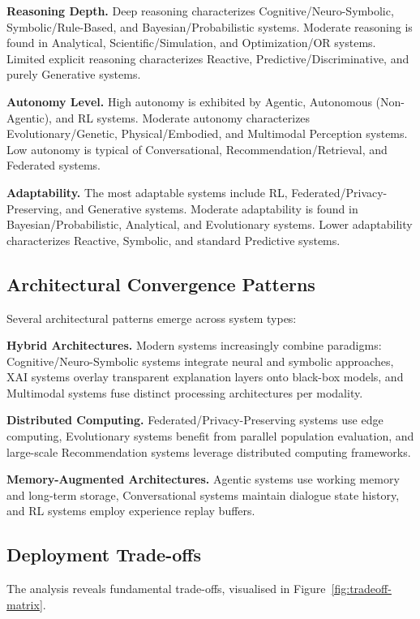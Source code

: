 \documentclass[12pt, a4paper]{article}
\begin{document}
\textbf{Reasoning Depth.} Deep reasoning characterizes Cognitive/Neuro-Symbolic, Symbolic/Rule-Based, and Bayesian/Probabilistic systems. Moderate reasoning is found in Analytical, Scientific/Simulation, and Optimization/OR systems. Limited explicit reasoning characterizes Reactive, Predictive/Discriminative, and purely Generative systems.

\textbf{Autonomy Level.} High autonomy is exhibited by Agentic, Autonomous (Non-Agentic), and RL systems. Moderate autonomy characterizes Evolutionary/Genetic, Physical/Embodied, and Multimodal Perception systems. Low autonomy is typical of Conversational, Recommendation/Retrieval, and Federated systems.

\textbf{Adaptability.} The most adaptable systems include RL, Federated/Privacy-Preserving, and Generative systems. Moderate adaptability is found in Bayesian/Probabilistic, Analytical, and Evolutionary systems. Lower adaptability characterizes Reactive, Symbolic, and standard Predictive systems.

\subsection{Architectural Convergence Patterns}

Several architectural patterns emerge across system types:

\textbf{Hybrid Architectures.} Modern systems increasingly combine paradigms: Cognitive/Neuro-Symbolic systems integrate neural and symbolic approaches, XAI systems overlay transparent explanation layers onto black-box models, and Multimodal systems fuse distinct processing architectures per modality.

\textbf{Distributed Computing.} Federated/Privacy-Preserving systems use edge computing, Evolutionary systems benefit from parallel population evaluation, and large-scale Recommendation systems leverage distributed computing frameworks.

\textbf{Memory-Augmented Architectures.} Agentic systems use working memory and long-term storage, Conversational systems maintain dialogue state history, and RL systems employ experience replay buffers.

\subsection{Deployment Trade-offs}
The analysis reveals fundamental trade-offs, visualised in Figure~\ref{fig:tradeoff-matrix}.
\end{document}
